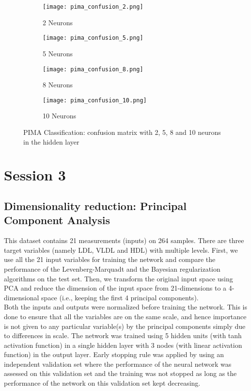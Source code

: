 \documentclass[paper=a4, fontsize=11pt]{scrartcl} %
\numberwithin{equation}{section} %
\begin{document}
\begin{figure}[H]
	\begin{subfigure}[b]{0.5\textwidth}
		\centering
		\texttt{[image: pima\_confusion\_2.png]}
		\caption{2 Neurons}
	\end{subfigure}
	\begin{subfigure}[b]{0.5\textwidth}
		\centering
		\texttt{[image: pima\_confusion\_5.png]}
		\caption{5 Neurons}
	\end{subfigure}
	
	\begin{subfigure}[b]{0.5\textwidth}
		\centering
		\texttt{[image: pima\_confusion\_8.png]}
		\caption{8 Neurons}
	\end{subfigure}
	\begin{subfigure}[b]{0.5\textwidth}
		\centering
		\texttt{[image: pima\_confusion\_10.png]}
		\caption{10 Neurons}
	\end{subfigure}
\caption{PIMA Classification: confusion matrix with 2, 5, 8 and 10 neurons in the hidden layer}
\label{pima}
\end{figure}

\section{Session 3}
\subsection{Dimensionality reduction: Principal Component Analysis}

This dataset contains 21 measurements (inputs) on 264 samples. There are three target variables (namely LDL, VLDL and HDL) with multiple levels. First, we use all the 21 input variables for training the network and compare the performance of the Levenberg-Marquadt and the Bayesian regularization algorithms on the test set. Then, we transform the original input space using PCA and reduce the dimension of the input space from 21-dimensions to a 4-dimensional space (i.e., keeping the first 4 principal components).\\

Both the inputs and outputs were normalized before training the network. This is done to ensure that all the variables are on the same scale, and hence importance is not given to any particular variable(s) by the principal components simply due to differences in scale. The network was trained using 5 hidden units (with tanh activation function) in a single hidden layer with 3 nodes (with linear activation function) in the output layer. Early stopping rule was applied by using an independent validation set where the performance of the neural network was assessed on this validation set and the training was not stopped as long as the performance of the network on this validation set kept decreasing.\\
\end{document}

